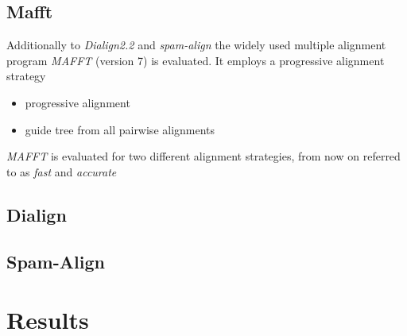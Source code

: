 \subsection{Mafft}
Additionally to \textit{Dialign2.2} and \textit{spam-align} the widely used multiple alignment program \textit{MAFFT} (version 7) is evaluated. It employs a progressive alignment strategy 

\begin{itemize}
	\item progressive alignment
	\item guide tree from all pairwise alignments
\end{itemize}

\textit{MAFFT} is evaluated for two different alignment strategies, from now on referred to as \textit{fast} and \textit{accurate}

\subsection{Dialign}

\subsection{Spam-Align}



\section{Results}
